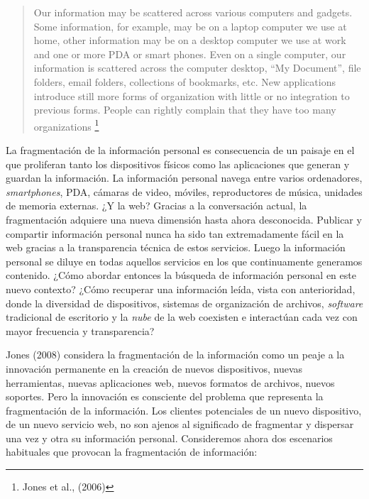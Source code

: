 \documentclass[12pt, a4paper,twoside]{book}
\begin{document}
\begin{quote}
Our information may be scattered across various computers and
gadgets. Some information, for example, may be on a laptop computer
we use at home, other information may be on a desktop computer we
use at work and one or more PDA or smart phones. Even on a single
computer, our information is scattered across the computer desktop,
``My Document'', file folders, email folders, collections of
bookmarks, etc. New applications introduce still more forms of
organization with little or no integration to previous forms.
People can rightly complain that they have too many organizations%
\footnote{Jones et al., (2006)}

\end{quote}
La fragmentación de la información personal es consecuencia de un
paisaje en el que proliferan tanto los dispositivos físicos como
las aplicaciones que generan y guardan la información. La
información personal navega entre varios ordenadores,
\emph{smartphones}, PDA, cámaras de video, móviles, reproductores
de música, unidades de memoria externas. ¿Y la web? Gracias a la
conversación actual, la fragmentación adquiere una nueva dimensión
hasta ahora desconocida. Publicar y compartir información personal
nunca ha sido tan extremadamente fácil en la web gracias a la
transparencia técnica de estos servicios. Luego la información
personal se diluye en todas aquellos servicios en los que
continuamente generamos contenido. ¿Cómo abordar entonces la
búsqueda de información personal en este nuevo contexto? ¿Cómo
recuperar una información leída, vista con anterioridad, donde la
diversidad de dispositivos, sistemas de organización de archivos,
\emph{software} tradicional de escritorio y la \emph{nube} de la
web coexisten e interactúan cada vez con mayor frecuencia y
transparencia?

Jones (2008) considera la fragmentación de la información como un
peaje a la innovación permanente en la creación de nuevos
dispositivos, nuevas herramientas, nuevas aplicaciones web, nuevos
formatos de archivos, nuevos soportes. Pero la innovación es
consciente del problema que representa la fragmentación de la
información. Los clientes potenciales de un nuevo dispositivo, de
un nuevo servicio web, no son ajenos al significado de fragmentar y
dispersar una vez y otra su información personal. Consideremos
ahora dos escenarios habituales que provocan la fragmentación de
información:
\end{document}
